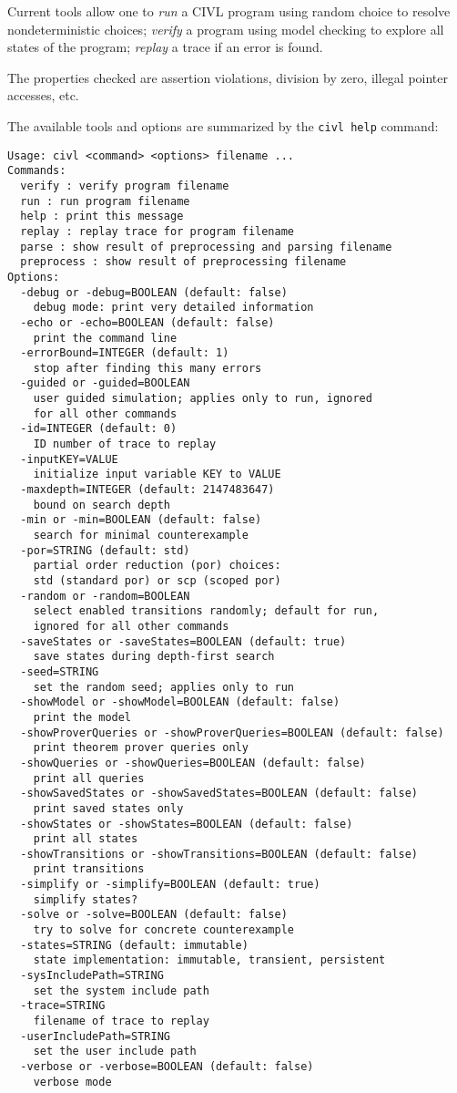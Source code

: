 \documentclass[11pt, oneside, letterpaper]{book}
\begin{document}
Current tools allow one to \emph{run} a CIVL program using random
choice to resolve nondeterministic choices; \emph{verify} a program
using model checking to explore all states of the program;
\emph{replay} a trace if an error is found.

The properties checked are assertion violations, division by zero,
illegal pointer accesses, etc.

The available tools and options are summarized by the \texttt{civl
  help} command:

\begin{verbatim}
Usage: civl <command> <options> filename ...
Commands:
  verify : verify program filename
  run : run program filename
  help : print this message
  replay : replay trace for program filename
  parse : show result of preprocessing and parsing filename
  preprocess : show result of preprocessing filename
Options:
  -debug or -debug=BOOLEAN (default: false)
    debug mode: print very detailed information
  -echo or -echo=BOOLEAN (default: false)
    print the command line
  -errorBound=INTEGER (default: 1)
    stop after finding this many errors
  -guided or -guided=BOOLEAN
    user guided simulation; applies only to run, ignored
    for all other commands
  -id=INTEGER (default: 0)
    ID number of trace to replay
  -inputKEY=VALUE
    initialize input variable KEY to VALUE
  -maxdepth=INTEGER (default: 2147483647)
    bound on search depth
  -min or -min=BOOLEAN (default: false)
    search for minimal counterexample
  -por=STRING (default: std)
    partial order reduction (por) choices:
    std (standard por) or scp (scoped por)
  -random or -random=BOOLEAN
    select enabled transitions randomly; default for run,
    ignored for all other commands
  -saveStates or -saveStates=BOOLEAN (default: true)
    save states during depth-first search
  -seed=STRING
    set the random seed; applies only to run
  -showModel or -showModel=BOOLEAN (default: false)
    print the model
  -showProverQueries or -showProverQueries=BOOLEAN (default: false)
    print theorem prover queries only
  -showQueries or -showQueries=BOOLEAN (default: false)
    print all queries
  -showSavedStates or -showSavedStates=BOOLEAN (default: false)
    print saved states only
  -showStates or -showStates=BOOLEAN (default: false)
    print all states
  -showTransitions or -showTransitions=BOOLEAN (default: false)
    print transitions
  -simplify or -simplify=BOOLEAN (default: true)
    simplify states?
  -solve or -solve=BOOLEAN (default: false)
    try to solve for concrete counterexample
  -states=STRING (default: immutable)
    state implementation: immutable, transient, persistent
  -sysIncludePath=STRING
    set the system include path
  -trace=STRING
    filename of trace to replay
  -userIncludePath=STRING
    set the user include path
  -verbose or -verbose=BOOLEAN (default: false)
    verbose mode
\end{verbatim}
\end{document}
